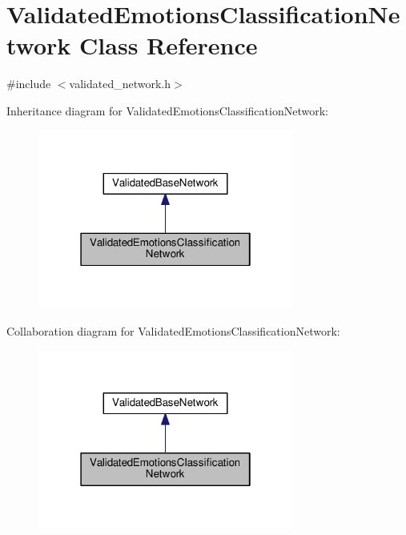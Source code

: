 \hypertarget{classValidatedEmotionsClassificationNetwork}{}\section{Validated\+Emotions\+Classification\+Network Class Reference}
\label{classValidatedEmotionsClassificationNetwork}


{\ttfamily \#include $<$validated\+\_\+network.\+h$>$}



Inheritance diagram for Validated\+Emotions\+Classification\+Network\+:
\nopagebreak
\begin{figure}[H]
\begin{center}
\leavevmode
\includegraphics[width=238pt]{classValidatedEmotionsClassificationNetwork__inherit__graph}
\end{center}
\end{figure}


Collaboration diagram for Validated\+Emotions\+Classification\+Network\+:
\nopagebreak
\begin{figure}[H]
\begin{center}
\leavevmode
\includegraphics[width=238pt]{classValidatedEmotionsClassificationNetwork__coll__graph}
\end{center}
\end{figure}
